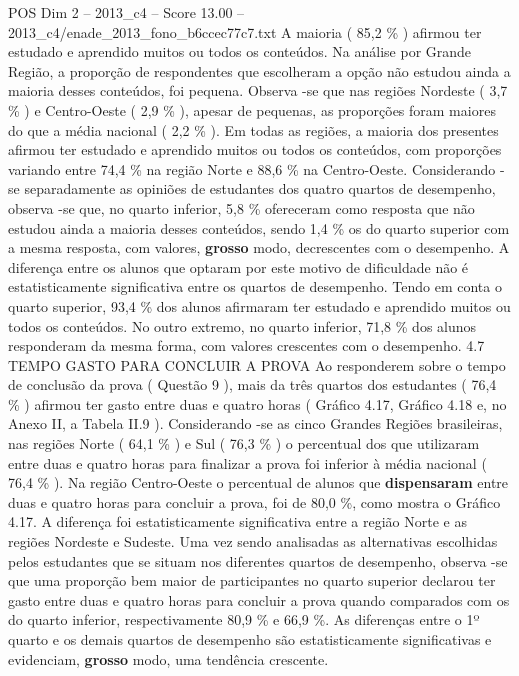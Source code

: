 \begin{textsample}{POS Dim 2 – 2013\_c4 – Score 13.00 – 2013\_c4/enade\_2013\_fono\_b6ccec77c7.txt}
A maioria ( 85,2 \% ) afirmou ter estudado e aprendido muitos ou todos os conteúdos.
Na análise por Grande Região, a proporção de respondentes que escolheram a opção não estudou ainda a maioria desses conteúdos, foi pequena.
Observa -se que nas regiões Nordeste ( 3,7 \% ) e Centro-Oeste ( 2,9 \% ), apesar de pequenas, as proporções foram maiores do que a média nacional ( 2,2 \% ).
Em todas as regiões, a maioria dos presentes afirmou ter estudado e aprendido muitos ou todos os conteúdos, com proporções variando entre 74,4 \% na região Norte e 88,6 \% na Centro-Oeste.
Considerando -se separadamente as opiniões de estudantes dos quatro quartos de desempenho, observa -se que, no quarto inferior, 5,8 \% ofereceram como resposta que não estudou ainda a maioria desses conteúdos, sendo 1,4 \% os do quarto superior com a mesma resposta, com valores, \textbf{grosso} modo, decrescentes com o desempenho.
A diferença entre os alunos que optaram por este motivo de dificuldade não é estatisticamente significativa entre os quartos de desempenho.
Tendo em conta o quarto superior, 93,4 \% dos alunos afirmaram ter estudado e aprendido muitos ou todos os conteúdos.
No outro extremo, no quarto inferior, 71,8 \% dos alunos responderam da mesma forma, com valores crescentes com o desempenho. 4.7 TEMPO GASTO PARA CONCLUIR A PROVA Ao responderem sobre o tempo de conclusão da prova ( Questão 9 ), mais da três quartos dos estudantes ( 76,4 \% ) afirmou ter gasto entre duas e quatro horas ( Gráfico 4.17, Gráfico 4.18 e, no Anexo II, a Tabela II.9 ).
Considerando -se as cinco Grandes Regiões brasileiras, nas regiões Norte ( 64,1 \% ) e Sul ( 76,3 \% ) o percentual dos que utilizaram entre duas e quatro horas para finalizar a prova foi inferior à média nacional ( 76,4 \% ).
Na região Centro-Oeste o percentual de alunos que \textbf{dispensaram} entre duas e quatro horas para concluir a prova, foi de 80,0 \%, como mostra o Gráfico 4.17.
A diferença foi estatisticamente significativa entre a região Norte e as regiões Nordeste e Sudeste.
Uma vez sendo analisadas as alternativas escolhidas pelos estudantes que se situam nos diferentes quartos de desempenho, observa -se que uma proporção bem maior de participantes no quarto superior declarou ter gasto entre duas e quatro horas para concluir a prova quando comparados com os do quarto inferior, respectivamente 80,9 \% e 66,9 \%.
As diferenças entre o 1º quarto e os demais quartos de desempenho são estatisticamente significativas e evidenciam, \textbf{grosso} modo, uma tendência crescente.

\end{textsample}
